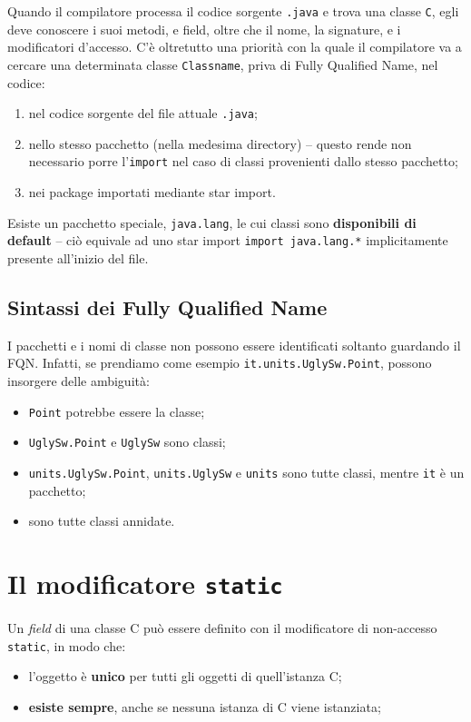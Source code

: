 \documentclass[\fontsizeclass,twocolumn]{\classname}
\theoremstyle{definition}
\theoremstyle{definition}
\begin{document}
Quando il compilatore processa il codice sorgente \texttt{.java} e trova una
classe \texttt{C}, egli deve conoscere i suoi metodi, e field, oltre che il
nome, la signature, e i modificatori d'accesso. C'è oltretutto una priorità con
la quale il compilatore va a cercare una determinata classe \texttt{Classname},
priva di Fully Qualified Name, nel codice:
\begin{enumerate}
    \item nel codice sorgente del file attuale \texttt{.java};
    \item nello stesso pacchetto (nella medesima directory) \--- questo rende
        non necessario porre l'\texttt{import} nel caso di classi provenienti
        dallo stesso pacchetto;
    \item nei package importati mediante star import.
\end{enumerate}

Esiste un pacchetto speciale, \texttt{java.lang}, le cui classi sono
\textbf{disponibili di default} \--- ciò equivale ad uno star import
\texttt{import java.lang.*} implicitamente presente all'inizio del file.

\subsection{Sintassi dei Fully Qualified Name}

I pacchetti e i nomi di classe non possono essere identificati soltanto
guardando il FQN. Infatti, se prendiamo come esempio
\texttt{it.units.UglySw.Point}, possono insorgere delle ambiguità:
\begin{itemize}
    \item \texttt{Point} potrebbe essere la classe;
    \item \texttt{UglySw.Point} e \texttt{UglySw} sono classi;
    \item \texttt{units.UglySw.Point}, \texttt{units.UglySw} e \texttt{units}
        sono tutte classi, mentre \texttt{it} è un pacchetto;
    \item sono tutte classi annidate.
\end{itemize}

\section{Il modificatore \texttt{static}}

Un \emph{field} di una classe C può essere definito con il modificatore di
non-accesso \texttt{static}, in modo che:
\begin{itemize}
    \item l'oggetto è \textbf{unico} per tutti gli oggetti di quell'istanza C;
    \item \textbf{esiste sempre}, anche se nessuna istanza di C viene
        istanziata;
\end{itemize}
\end{document}
